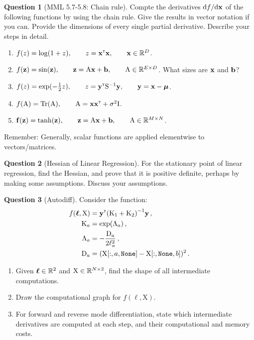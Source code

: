 \documentclass[a4paper]{article}
\newcommand{\mat}[1]{{\mathrm{{#1}}}} %
\theoremstyle{definition}
\newtheorem{question}{Question}
\begin{document}
\begin{question}[MML 5.7-5.8: Chain rule]
Compte the derivatives $\mathrm{d} f /\mathrm{d}\mathbf{x}$ of the following functions by using the chain rule. Give the results in vector notation if you can. Provide the dimensions of every single partial derivative. Describe your steps in detail.
\begin{enumerate}[label=\alph*.]
\item $f(z) = \log(1+z), \qquad z = \mathbf{x}^\mathrm{\textsf{\tiny T}}\mathbf{x}, \qquad \mathbf{x} \in \mathbb{R}^D$.
\item $f(\vz) = \sin(\vz), \qquad \vz = \mat A\vx + \vb, \qquad \mat A \in \Reals^{E\times D}$. What sizes are $\mathbf{x}$ and $\mathbf{b}$?
\item $f(z) = \exp(-\frac{1}{2}z), \qquad z = \vy\transpose \mat S\inv \vy, \qquad \vy = \vx -\vmu$.
\item $f(\mat A) = \Tr(\mat A), \qquad \mat A = \vx\vx\transpose + \sigma^2 \mat I$.
\item $\vf(\vz) = \tanh(\vz), \qquad \vz = \mat A \vx + \vb, \qquad \mat A \in \Reals^{M\times N}$.
\end{enumerate}
Remember: Generally, scalar functions are applied elementwise to vectors/matrices.
\end{question}


\begin{question}[Hessian of Linear Regression]
\label{q:hessian}
For the stationary point of linear regression, find the Hessian, and prove that it is positive definite, perhaps by making some assumptions. Discuss your assumptions.
\end{question}


\begin{question}[Autodiff]
\label{q:autodiff}
Consider the function:
\begin{align}
f(\boldsymbol \ell, \mat X) &= \vy\transpose \left(\mat K_1 + \mat K_2\right)\inv \vy\,, \\
\mat K_a &= \exp\left(\mat \Lambda_a\right) \,, \\
\mat \Lambda_a &= -\frac{\mat D_a}{2\ell_a^2} \,, \\
\mat D_a &= (\mat X[:, a, \text{\texttt{None}}] - \mat X[:, \text{\texttt{None}}, b])^2 \,.
\end{align}
\begin{enumerate}[label=\alph*.]
\item Given $\boldsymbol \ell \in \mathbb{R}^2$ and $\mat X \in \Reals^{N\times 2}$, find the shape of all intermediate computations.
\item Draw the computational graph for $f(\boldsymbol\ell, \mat X)$.
\item For forward and reverse mode differentiation, state which intermediate derivatives are computed at each step, and their computational and memory costs.
\end{enumerate}
\end{question}
\end{document}
